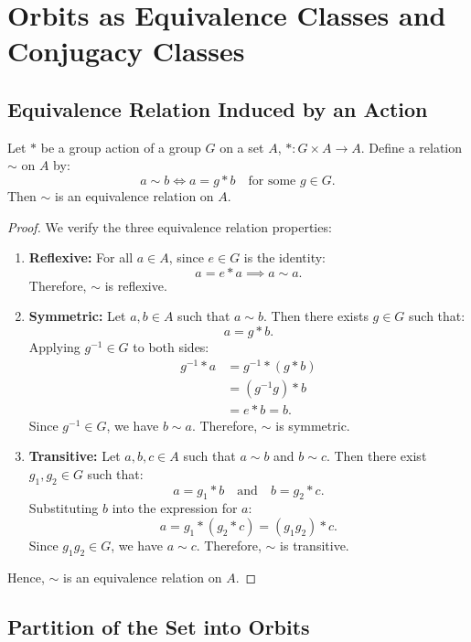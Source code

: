 \section{Orbits as Equivalence Classes and Conjugacy Classes}

\subsection{Equivalence Relation Induced by an Action}

\begin{theorem}
Let $*$ be a group action of a group $G$ on a set $A$, $* : G \times A \to A$. Define a relation $\sim$ on $A$ by:
\[
a \sim b \iff a = g * b \quad \text{for some } g \in G.
\]
Then $\sim$ is an equivalence relation on $A$.
\end{theorem}

\begin{proof}
We verify the three equivalence relation properties:
\begin{enumerate}[label=(\roman*)]
    \item \textbf{Reflexive:} For all $a \in A$, since $e \in G$ is the identity:
    \[
    a = e * a \implies a \sim a.
    \]
    Therefore, $\sim$ is reflexive.
    
    \item \textbf{Symmetric:} Let $a, b \in A$ such that $a \sim b$. Then there exists $g \in G$ such that:
    \[
    a = g * b.
    \]
    Applying $g^{-1} \in G$ to both sides:
    \begin{align*}
    g^{-1} * a &= g^{-1} * (g * b) \\
    &= (g^{-1} g) * b \\
    &= e * b = b.
    \end{align*}
    Since $g^{-1} \in G$, we have $b \sim a$. Therefore, $\sim$ is symmetric.
    
    \item \textbf{Transitive:} Let $a, b, c \in A$ such that $a \sim b$ and $b \sim c$. Then there exist $g_1, g_2 \in G$ such that:
    \[
    a = g_1 * b \quad \text{and} \quad b = g_2 * c.
    \]
    Substituting $b$ into the expression for $a$:
    \[
    a = g_1 * (g_2 * c) = (g_1 g_2) * c.
    \]
    Since $g_1 g_2 \in G$, we have $a \sim c$. Therefore, $\sim$ is transitive.
\end{enumerate}
Hence, $\sim$ is an equivalence relation on $A$.
\end{proof}

\subsection{Partition of the Set into Orbits}


